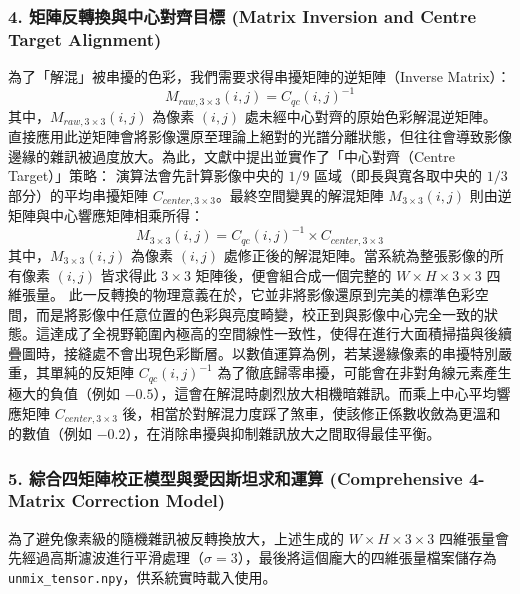 \subsubsection*{4. 矩陣反轉換與中心對齊目標 (Matrix Inversion and Centre Target Alignment)}
為了「解混」被串擾的色彩，我們需要求得串擾矩陣的逆矩陣（Inverse Matrix）：
\begin{equation}
    M_{raw, 3 \times 3}(i, j) = C_{qc}(i, j)^{-1}
\end{equation}
其中，$M_{raw, 3 \times 3}(i, j)$ 為像素 $(i, j)$ 處未經中心對齊的原始色彩解混逆矩陣。
直接應用此逆矩陣會將影像還原至理論上絕對的光譜分離狀態，但往往會導致影像邊緣的雜訊被過度放大。為此，文獻中提出並實作了「中心對齊（Centre Target）」策略：
演算法會先計算影像中央的 $1/9$ 區域（即長與寬各取中央的 $1/3$ 部分）的平均串擾矩陣 $C_{center, 3 \times 3}$。最終空間變異的解混矩陣 $M_{3 \times 3}(i, j)$ 則由逆矩陣與中心響應矩陣相乘所得：
\begin{equation}
    M_{3 \times 3}(i, j) = C_{qc}(i, j)^{-1} \times C_{center, 3 \times 3}
\end{equation}
其中，$M_{3 \times 3}(i, j)$ 為像素 $(i, j)$ 處修正後的解混矩陣。當系統為整張影像的所有像素 $(i, j)$ 皆求得此 $3 \times 3$ 矩陣後，便會組合成一個完整的 $W \times H \times 3 \times 3$ 四維張量。
此一反轉換的物理意義在於，它並非將影像還原到完美的標準色彩空間，而是將影像中任意位置的色彩與亮度畸變，校正到與影像中心完全一致的狀態。這達成了全視野範圍內極高的空間線性一致性，使得在進行大面積掃描與後續疊圖時，接縫處不會出現色彩斷層。以數值運算為例，若某邊緣像素的串擾特別嚴重，其單純的反矩陣 $C_{qc}(i, j)^{-1}$ 為了徹底歸零串擾，可能會在非對角線元素產生極大的負值（例如 $-0.5$），這會在解混時劇烈放大相機暗雜訊。而乘上中心平均響應矩陣 $C_{center, 3 \times 3}$ 後，相當於對解混力度踩了煞車，使該修正係數收斂為更溫和的數值（例如 $-0.2$），在消除串擾與抑制雜訊放大之間取得最佳平衡。

\subsubsection*{5. 綜合四矩陣校正模型與愛因斯坦求和運算 (Comprehensive 4-Matrix Correction Model)}
為了避免像素級的隨機雜訊被反轉換放大，上述生成的 $W \times H \times 3 \times 3$ 四維張量會先經過高斯濾波進行平滑處理（$\sigma=3$），最後將這個龐大的四維張量檔案儲存為 \texttt{unmix\_tensor.npy}，供系統實時載入使用。

